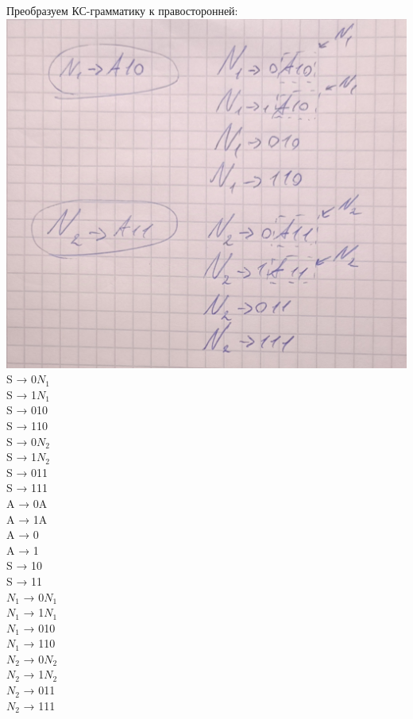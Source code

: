 \documentclass[a4paper,14pt]{extarticle}
\begin{document}
\begin{enumerate}[1.]
    Преобразуем КС-грамматику к правосторонней:\\
    \includegraphics[width=140mm]{task1}\\
S → 0$N_1$\\
S → 1$N_1$\\
S → 010\\
S → 110\\
S → 0$N_2$\\
S → 1$N_2$\\
S → 011\\
S → 111\\
A → 0A\\
A → 1A\\
A → 0\\
A → 1\\
S → 10\\
S → 11\\
$N_1$ → 0$N_1$\\
$N_1$ → 1$N_1$\\
$N_1$ → 010\\
$N_1$ → 110\\
$N_2$ → 0$N_2$\\
$N_2$ → 1$N_2$\\
$N_2$ → 011\\
$N_2$ → 111\\


\end{enumerate}
\end{document}

